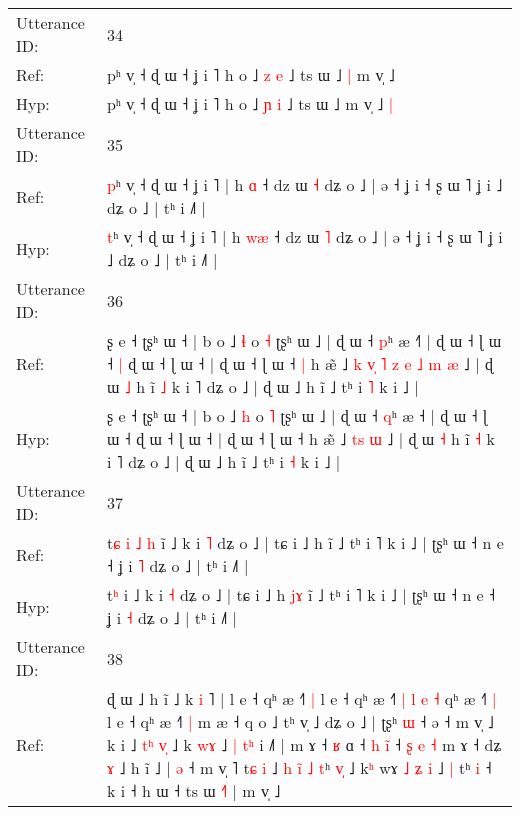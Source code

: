\documentclass[10pt]{article}
\DeclareRobustCommand{\hl}[1]{{\textcolor{red}{#1}}}
\begin{document}
\begin{longtable}{ll}
 \\
\midrule
Utterance ID: & 34 \\
Ref: & pʰ v̩ ˧ ɖ ɯ ˧ ʝ i ˥ h o ˩ \hl{z} \hl{e} ˩ ts ɯ ˩\hl{ }\hl{|} m v̩ ˩\hl{}\hl{}
 \\
Hyp: & pʰ v̩ ˧ ɖ ɯ ˧ ʝ i ˥ h o ˩ \hl{ɲ} \hl{i} ˩ ts ɯ ˩\hl{}\hl{} m v̩ ˩\hl{ }\hl{|}
 \\
\midrule
Utterance ID: & 35 \\
Ref: & \hl{p}ʰ v̩ ˧ ɖ ɯ ˧ ʝ i ˥ | h \hl{}\hl{ɑ} ˧ dz ɯ \hl{˧} dʑ o ˩ | ə ˧ ʝ i ˧ ʂ ɯ ˥ ʝ i ˩ dʑ o ˩ | tʰ i ˩˥ |
 \\
Hyp: & \hl{t}ʰ v̩ ˧ ɖ ɯ ˧ ʝ i ˥ | h \hl{w}\hl{æ} ˧ dz ɯ \hl{˥} dʑ o ˩ | ə ˧ ʝ i ˧ ʂ ɯ ˥ ʝ i ˩ dʑ o ˩ | tʰ i ˩˥ |
 \\
\midrule
Utterance ID: & 36 \\
Ref: & ʂ e ˧ ʈʂʰ ɯ ˧ | b o ˩ \hl{ɬ} o \hl{˧} ʈʂʰ ɯ ˩ | ɖ ɯ ˧ \hl{p}ʰ æ ˧\hl{˥} | ɖ ɯ ˧ ɭ ɯ ˧\hl{ }\hl{|} ɖ ɯ ˧ ɭ ɯ ˧ | ɖ ɯ ˧ ɭ ɯ ˧\hl{ }\hl{|} h æ̃ ˩\hl{ }\hl{k}\hl{ }\hl{v}\hl{̩}\hl{ }\hl{˥}\hl{ }\hl{z}\hl{ }\hl{e} \hl{˩}\hl{ }\hl{m} \hl{æ} ˩ | ɖ ɯ \hl{˩} h ĩ \hl{˩} k i ˥ dʑ o ˩ | ɖ ɯ ˩ h ĩ ˩ tʰ i \hl{˥} k i ˩ |
 \\
Hyp: & ʂ e ˧ ʈʂʰ ɯ ˧ | b o ˩ \hl{h} o \hl{˥} ʈʂʰ ɯ ˩ | ɖ ɯ ˧ \hl{q}ʰ æ ˧\hl{} | ɖ ɯ ˧ ɭ ɯ ˧\hl{}\hl{} ɖ ɯ ˧ ɭ ɯ ˧ | ɖ ɯ ˧ ɭ ɯ ˧\hl{}\hl{} h æ̃ ˩\hl{}\hl{}\hl{}\hl{}\hl{}\hl{}\hl{}\hl{}\hl{}\hl{}\hl{} \hl{}\hl{t}\hl{s} \hl{ɯ} ˩ | ɖ ɯ \hl{˧} h ĩ \hl{˧} k i ˥ dʑ o ˩ | ɖ ɯ ˩ h ĩ ˩ tʰ i \hl{˧} k i ˩ |
 \\
\midrule
Utterance ID: & 37 \\
Ref: & t\hl{ɕ}\hl{ }\hl{i}\hl{ }\hl{˩}\hl{ }\hl{h} i\hl{̃} ˩ k i \hl{˥} dʑ o ˩ | tɕ i ˩ h\hl{}\hl{}\hl{} ĩ ˩ tʰ i ˥ k i ˩ | ʈʂʰ ɯ ˧ n e ˧ ʝ i \hl{˥} dʑ o ˩ | tʰ i ˩˥ |
 \\
Hyp: & t\hl{}\hl{}\hl{}\hl{}\hl{}\hl{}\hl{ʰ} i\hl{} ˩ k i \hl{˧} dʑ o ˩ | tɕ i ˩ h\hl{ }\hl{j}\hl{ɤ} ĩ ˩ tʰ i ˥ k i ˩ | ʈʂʰ ɯ ˧ n e ˧ ʝ i \hl{˧} dʑ o ˩ | tʰ i ˩˥ |
 \\
\midrule
Utterance ID: & 38 \\
Ref: & ɖ ɯ ˩ h ĩ ˩ k \hl{i} ˥ | l e ˧ qʰ \hl{}æ ˧\hl{˥}\hl{ }\hl{|} l e ˧ qʰ æ ˧\hl{˥} \hl{|} \hl{l} \hl{e} \hl{˧} qʰ æ ˧\hl{˥}\hl{ }\hl{|} l e ˧ qʰ æ ˧\hl{˥}\hl{ }\hl{|} m æ ˧ q o ˩ tʰ v̩ ˩ dʑ o ˩ | ʈʂʰ\hl{ }\hl{ɯ} ˧ ə ˧ m v̩ ˩ k i ˩ \hl{t}\hl{ʰ} \hl{v}\hl{̩} ˩ k \hl{w}\hl{ɤ} ˩\hl{ }\hl{|} \hl{t}\hl{ʰ} i ˩\hl{˥} | m ɤ ˧ \hl{ʁ} ɑ ˧ \hl{h} \hl{i}\hl{̃} ˧\hl{ }\hl{ʂ}\hl{ }\hl{e} \hl{˧} m ɤ ˧ dʑ \hl{ɤ} ˩ h i\hl{̃} ˩ | \hl{ə} ˧ m v̩ ˥ t\hl{ɕ} \hl{i} ˩\hl{ }\hl{h}\hl{ }\hl{i}\hl{̃} \hl{˩}\hl{ }\hl{t}ʰ \hl{v}\hl{̩} ˩ k\hl{ʰ} wɤ\hl{ }\hl{˩}\hl{ }\hl{ʑ}\hl{ }\hl{i} ˩\hl{ }\hl{|} tʰ \hl{}\hl{i} ˧ k i ˧ h ɯ ˧ ts ɯ \hl{˧}˥ | m v̩ ˩\hl{}\hl{}

\end{longtable}
\end{document}
